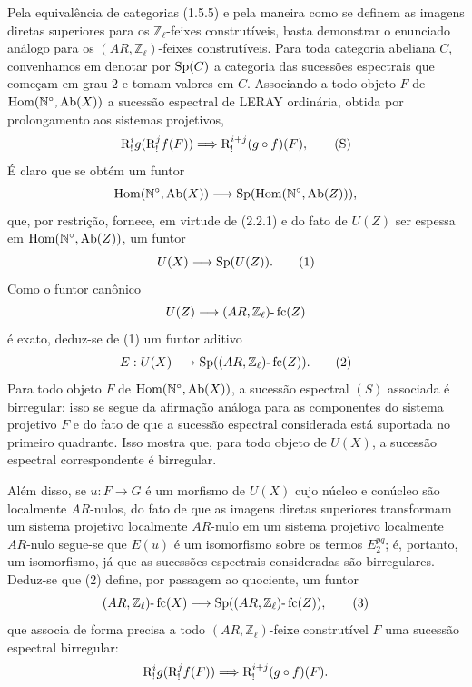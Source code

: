 \begin{prooftext}[Demonstração]
Pela equivalência de categorias (1.5.5) e pela maneira como se definem as imagens diretas superiores para os \(\mathbb Z_\ell\)-feixes construtíveis, basta demonstrar o enunciado análogo para os \((AR,\mathbb Z_\ell)\)-feixes construtíveis. Para toda categoria abeliana \(C\), convenhamos em denotar por \(\operatorname{Sp}(C)\) a categoria das sucessões espectrais que começam em grau \(2\) e tomam valores em \(C\). Associando a todo objeto \(F\) de \(\operatorname{Hom}(\mathbb N^\circ,\operatorname{Ab}(X))\) a sucessão espectral de LERAY ordinária, obtida por prolongamento aos sistemas projetivos,
\[
\mathrm{R}^i_! g(\mathrm{R}^j_! f(F))\Longrightarrow \mathrm{R}^{i+j}_!(g\circ f)(F),
\tag{S}
\]
É claro que se obtém um funtor
\[
\operatorname{Hom}(\mathbb N^\circ,\operatorname{Ab}(X))\longrightarrow \operatorname{Sp}(\operatorname{Hom}(\mathbb N^\circ,\operatorname{Ab}(Z))),
\]
que, por restrição, fornece, em virtude de (2.2.1) e do fato de \(U(Z)\) ser espessa em \(\operatorname{Hom}(\mathbb N^\circ,\operatorname{Ab}(Z))\), um funtor
\[
U(X)\longrightarrow \operatorname{Sp}(U(Z)).
\tag{1}
\]
Como o funtor canônico
\[
U(Z)\longrightarrow (AR,\mathbb Z_\ell)\text{-}\operatorname{fc}(Z)
\]
é exato, deduz-se de (1) um funtor aditivo
\[
E:U(X)\longrightarrow \operatorname{Sp}((AR,\mathbb Z_\ell)\text{-}\operatorname{fc}(Z)).
\tag{2}
\]
Para todo objeto \(F\) de \(\operatorname{Hom}(\mathbb N^\circ,\operatorname{Ab}(X))\), a sucessão espectral \((S)\) associada é birregular: isso se segue da afirmação análoga para as componentes do sistema projetivo \(F\) e do fato de que a sucessão espectral considerada está suportada no primeiro quadrante. Isso mostra que, para todo objeto de \(U(X)\), a sucessão espectral correspondente é birregular.

Além disso, se \(u:F\to G\) é um morfismo de \(U(X)\) cujo núcleo e conúcleo são localmente \(AR\)-nulos, do fato de que as imagens diretas superiores transformam um sistema projetivo localmente \(AR\)-nulo em um sistema projetivo localmente \(AR\)-nulo segue-se que \(E(u)\) é um isomorfismo sobre os termos \(E_2^{pq}\); é, portanto, um isomorfismo, já que as sucessões espectrais consideradas são birregulares. Deduz-se que (2) define, por passagem ao quociente, um funtor
\[
(AR,\mathbb Z_\ell)\text{-}\operatorname{fc}(X)
\longrightarrow \operatorname{Sp}((AR,\mathbb Z_\ell)\text{-}\operatorname{fc}(Z)),
\tag{3}
\]
que associa de forma precisa a todo \((AR,\mathbb Z_\ell)\)-feixe construtível \(F\) uma sucessão espectral birregular:
\[
\mathrm{R}^i_!g(\mathrm{R}^j_!f(F))\Longrightarrow \mathrm{R}^{i+j}_!(g\circ f)(F).
\]
\end{prooftext}
